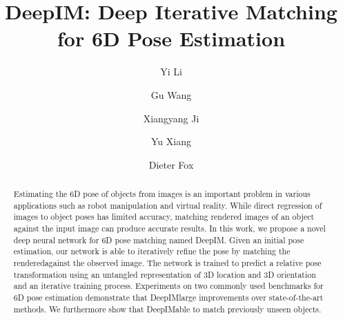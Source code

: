 \documentclass[twocolumn]{svjour3}
\newcommand{\dimnet}[0]{DeepIM}
\newcommand{\rend}[0]{rendered}
\begin{document}

\title{DeepIM: Deep Iterative Matching for 6D Pose Estimation} %


\author{Yi Li \and Gu Wang \and Xiangyang Ji \and Yu Xiang \and Dieter Fox}

\maketitle

\begin{abstract}

Estimating the 6D pose of objects from images is an important problem in various applications such as robot manipulation and virtual reality. While direct regression of images to object poses has limited accuracy, matching rendered images of an object against the input image can produce accurate results. In this work, we propose a novel deep neural network for 6D pose matching named \dimnet. Given an initial pose estimation, our network is able to iteratively refine the pose by matching the \rend\image against the observed image. The network is trained to predict a relative pose transformation using an untangled representation of 3D location and 3D orientation and an iterative training process. Experiments on two commonly used benchmarks for 6D pose estimation demonstrate that \dimnet \achieves large improvements over state-of-the-art methods. We furthermore show that \dimnet\is able to match previously unseen objects.

\end{abstract}
\end{document}
